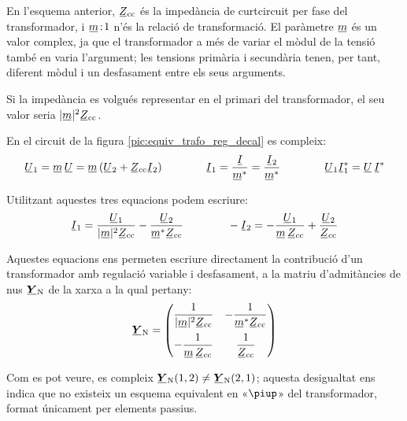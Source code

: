 En l'esquema anterior, $\cmplx{Z}\ped{cc}$ és la impedància de curtcircuit per fase del transformador, i $\cmplx{m}\!:\!1$ n'és la
relació de transformació. El paràmetre $\cmplx{m}$ és un valor
complex, ja que el transformador a més de variar el mòdul de la
tensió també en varia  l'argument; les tensions primària i
secundària tenen, per tant,  diferent mòdul i un desfasament entre els
seus arguments.

Si la impedància es volgués representar en el primari del
transformador, el seu valor seria $|\cmplx{m}|^2 \cmplx{Z}\ped{cc}$.

En el circuit de la figura \vref{pic:equiv_trafo_reg_decal} es
compleix: 
\begin{equation}
   \cmplx{U}_1 = \cmplx{m} \,\cmplx{U} = \cmplx{m}\,
   (\cmplx{U}_2+\cmplx{Z}\ped{cc}\cmplx{I}_2)
   \qquad\qquad
   \cmplx{I}_1 = \frac{\cmplx{I}}{\cmplx{m}^*} = \frac{\cmplx{I}_2}{\cmplx{m}^*}
   \qquad\qquad
   \cmplx{U}_1 \cmplx{I}_1^* = \cmplx{U} \,\cmplx{I}^*
\end{equation}

Utilitzant aquestes tres equacions podem escriure:
\begin{equation}
   \cmplx{I}_1 = \frac{\cmplx{U}_1}{|\cmplx{m}|^2 \cmplx{Z}\ped{cc}} - \frac{\cmplx{U}_2}
   {\cmplx{m}^* \cmplx{Z}\ped{cc}} \qquad\qquad
   - \cmplx{I}_2 = - \frac{\cmplx{U}_1}{\cmplx{m} \,\cmplx{Z}\ped{cc}} + \frac{\cmplx{U}_2}
   {\cmplx{Z}\ped{cc}}
\end{equation}

Aquestes equacions ens permeten escriure directament la
contribució d'un transformador amb regulació variable i desfasament, a
la matriu d'admitàncies de nus $\mcmplx{Y}\ped{N}$ de la xarxa a la
qual pertany: 
\begin{equation} \label{eq:yn_trafo_reg_decal}
   \mcmplx{Y}\ped{N} = \begin{pmatrix}
     \dfrac{1}{|\cmplx{m}|^2 \cmplx{Z}\ped{cc}} & - \dfrac{1}
   {\cmplx{m}^* \cmplx{Z}\ped{cc}} \\[2.5ex]
     - \dfrac{1}{\cmplx{m} \,\cmplx{Z}\ped{cc}} & \dfrac{1}
   {\cmplx{Z}\ped{cc}}
   \end{pmatrix}
\end{equation}

Com es pot veure, es compleix $\mcmplx{Y}\ped{N}(1,2) \neq
\mcmplx{Y}\ped{N}(2,1)$; aquesta desigualtat ens indica que no existeix un esquema
equivalent en «$\piup$» del transformador, format únicament per
elements passius.

